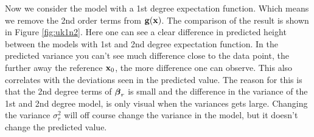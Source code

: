 Now we consider the model with a 1st degree expectation function. Which means we remove the 2nd order terms from $\boldsymbol{\mathbf{g}}(\boldsymbol{\mathbf{x}})$. The comparison of the result is shown in Figure \ref{fig:uk1n2}. Here one can see a clear difference in predicted height between the models with 1st and 2nd degree expectation function. In the predicted variance you can't see much difference close to the data point, the further away the reference $\boldsymbol{\mathbf{x}}_0$, the more difference one can observe. This also correlates with the deviations seen in the predicted value. The reason for this is that the 2nd degree terms of $\boldsymbol{\mathbf{\beta}}_r$ is small and the difference in the variance of the 1st and 2nd degree model, is only visual when the variances gets large. Changing the variance $\sigma_r^2$ will off course change the variance in the model, but it doesn't change the predicted value.
